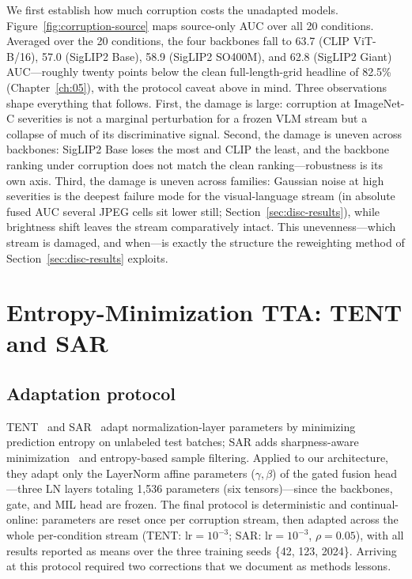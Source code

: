 We first establish how much corruption costs the unadapted models.
Figure~\ref{fig:corruption-source} maps source-only AUC over all 20
conditions. Averaged over the 20 conditions, the four backbones fall to
63.7 (CLIP ViT-B/16), 57.0 (SigLIP2 Base), 58.9 (SigLIP2 SO400M), and 62.8
(SigLIP2 Giant) AUC---roughly twenty points below the clean full-length-grid
headline of 82.5\% (Chapter~\ref{ch:05}), with the protocol caveat above in
mind. Three observations shape everything that follows. First, the damage is
large: corruption at ImageNet-C severities is not a marginal perturbation for
a frozen VLM stream but a collapse of much of its discriminative signal.
Second, the damage is uneven across backbones: SigLIP2 Base loses the most
and CLIP the least, and the backbone ranking under corruption does not match
the clean ranking---robustness is its own axis. Third, the damage is uneven
across families: Gaussian noise at high severities is the
deepest failure mode for the visual-language stream (in absolute fused
AUC several JPEG cells sit lower still;
Section~\ref{sec:disc-results}), while brightness
shift leaves the stream comparatively intact. This
unevenness---which stream is damaged, and when---is exactly the structure the
reweighting method of Section~\ref{sec:disc-results} exploits.

\section{Entropy-Minimization TTA: TENT and SAR}
\label{sec:entropy-tta}

\subsection{Adaptation protocol}

TENT~\cite{wang2021tent} and SAR~\cite{niu2023sar} adapt normalization-layer
parameters by minimizing prediction entropy on unlabeled test batches; SAR
adds sharpness-aware minimization~\cite{foret2021sam} and entropy-based
sample filtering. Applied to our architecture, they adapt only the LayerNorm
affine parameters ($\gamma,\beta$) of the gated fusion head---three LN layers
totaling 1{,}536 parameters (six tensors)---since the backbones, gate, and
MIL head are frozen. The final protocol is deterministic and
continual-online: parameters are reset once per corruption stream, then
adapted across the whole per-condition stream (TENT: $\mathrm{lr}=10^{-3}$;
SAR: $\mathrm{lr}=10^{-3}$, $\rho=0.05$), with all results reported as means
over the three training seeds \{42, 123, 2024\}. Arriving at this protocol
required two corrections that we document as methods lessons.

